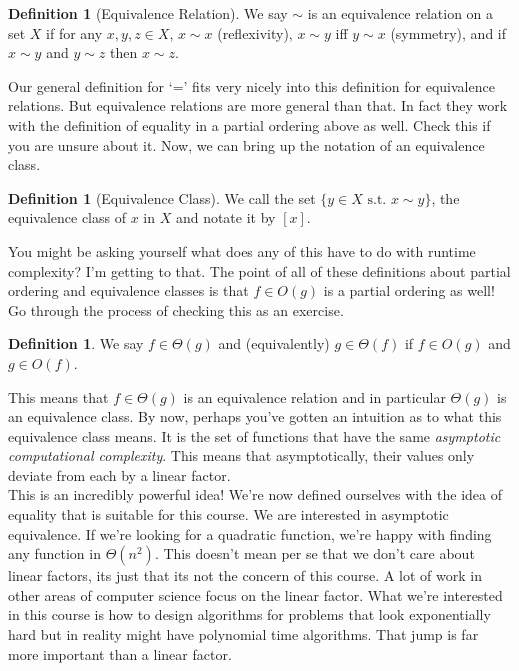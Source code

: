 \documentclass[10pt]{article}
\theoremstyle{plain}
\theoremstyle{definition}
\newtheorem{defn}[thm]{Definition} %
\newcommand{\st}{\text{ s.t. }}
\numberwithin{equation}{section}
\numberwithin{figure}{section}
\begin{document}
\begin{defn}[Equivalence Relation]
We say $\sim$ is an equivalence relation on a set $X$ if for any $x, y, z \in X$, $x \sim x$ (reflexivity), $x \sim y$ iff $y \sim x$ (symmetry), and if $x \sim y$ and $y \sim z$ then $x \sim z$.
\end{defn}

\noindent Our general definition for `=' fits very nicely into this definition for equivalence relations. But equivalence relations are more general than that. In fact they work with the definition of equality in a partial ordering above as well. Check this if you are unsure about it. Now, we can bring up the notation of an equivalence class.

\begin{defn}[Equivalence Class]
We call the set $\{ y \in X \st x \sim y \}$, the equivalence class of $x$ in $X$ and notate it by $[x]$.
\end{defn}

\noindent You might be asking yourself what does any of this have to do with runtime complexity? I'm getting to that. The point of all of these definitions about partial ordering and equivalence classes is that $f \in O(g)$ is a partial ordering as well! Go through the process of checking this as an exercise. 

\begin{defn}
We say $f \in \Theta(g)$ and (equivalently) $g \in \Theta(f)$ if $f \in O(g)$ and $g \in O(f)$.
\end{defn}

\noindent This means that $f \in \Theta(g)$ is an equivalence relation and in particular $\Theta(g)$ is an equivalence class. By now, perhaps you've gotten an intuition as to what this equivalence class means. It is the set of functions that have the same \emph{asymptotic computational complexity}. This means that asymptotically, their values only deviate from each by a linear factor. \\

\noindent This is an incredibly powerful idea! We're now defined ourselves with the idea of equality that is suitable for this course. We are interested in asymptotic equivalence. If we're looking for a quadratic function, we're happy with finding any function in $\Theta(n^2)$. This doesn't mean per se that we don't care about linear factors, its just that its not the concern of this course. A lot of work in other areas of computer science focus on the linear factor. What we're interested in this course is how to design algorithms for problems that look exponentially hard but in reality might have polynomial time algorithms. That jump is far more important than a linear factor. \\
\end{document}
